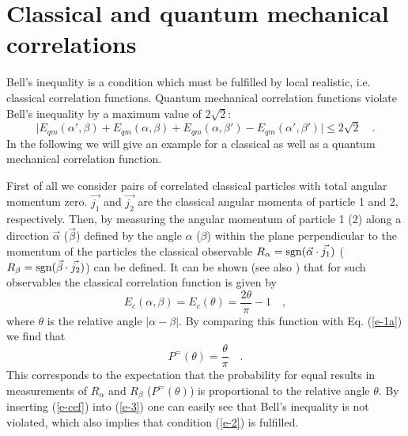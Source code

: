 \section{Classical and quantum mechanical correlations}

Bell\rq s inequality is a condition which must be fulfilled by local
realistic, i.e. classical correlation functions. Quantum mechanical
correlation functions violate
Bell\rq s inequality by a maximum value of $2\sqrt{2}$:
\[
\mid E_{qm}(\alpha ',\beta )+
E_{qm}(\alpha ,\beta )+
E_{qm}(\alpha ,\beta ') -
E_{qm}(\alpha ',\beta ')\mid \le 2\sqrt{2}  \quad .
\]
In the following we will give an example for a classical as well as a
quantum mechanical correlation function.

First of all we consider pairs of correlated classical particles with total
angular momentum zero. $\vec{j_1}$ and $\vec{j_2}$ are the classical angular
momenta of particle 1 and 2, respectively. Then, by measuring the angular
momentum of particle 1 (2) along a direction $\vec{\alpha}$
($\vec{\beta}$) defined by the angle $\alpha$ ($\beta$) within the plane
perpendicular to the momentum of the particles
the classical observable $R_\alpha ={\rm sgn} (\vec{\alpha} \cdot
\vec{j_1})$
($R_\beta ={\rm sgn} (\vec{\beta} \cdot \vec{j_2})$) can be defined.
It can be shown \cite[Eq. 10]{bell}
(see also \cite{peres222,peres}) that for such observables the classical
correlation function is
given by
\begin{equation}
E_{c}(\alpha,\beta)=E_{c}(\theta)=
\frac{2 \theta}{\pi} -1  \quad ,
\label{e-cef}
\end{equation}
where $\theta$ is the relative angle $\vert \alpha - \beta \vert$.
By comparing this function with Eq. (\ref{e-1a}) we find that
\begin{equation}
P^=(\theta )= \frac{\theta}{\pi} \quad .
\nonumber
\end{equation}
This corresponds to the expectation that the probability for
equal results in measurements of $R_\alpha$ and $R_\beta$
($P^=(\theta)$) is proportional to the relative angle
$\theta$. By inserting (\ref{e-cef}) into (\ref{e-3}) one can easily see
that Bell\rq s inequality is not violated, which also implies that
condition (\ref{e-2}) is fulfilled.

